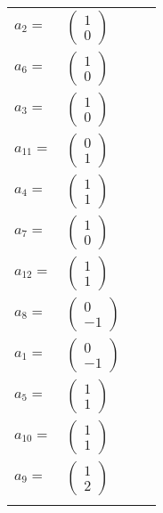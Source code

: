 \documentclass[1p]{elsarticle_modified}
\theoremstyle{definition}
\begin{document}
\begin{tabular}{m{7pt} m{180pt} m{7pt} m{180pt} }
\flushright $a_{2}=$&$\begin{pmatrix}1\\0\end{pmatrix}$ \\
\flushright $a_{6}=$&$\begin{pmatrix}1\\0\end{pmatrix}$ \\
\flushright $a_{3}=$&$\begin{pmatrix}1\\0\end{pmatrix}$ \\
\flushright $a_{11}=$&$\begin{pmatrix}0\\1\end{pmatrix}$ \\
\flushright $a_{4}=$&$\begin{pmatrix}1\\1\end{pmatrix}$ \\
\flushright $a_{7}=$&$\begin{pmatrix}1\\0\end{pmatrix}$ \\
\flushright $a_{12}=$&$\begin{pmatrix}1\\1\end{pmatrix}$ \\
\flushright $a_{8}=$&$\begin{pmatrix}0\\-1\end{pmatrix}$ \\
\flushright $a_{1}=$&$\begin{pmatrix}0\\-1\end{pmatrix}$ \\
\flushright $a_{5}=$&$\begin{pmatrix}1\\1\end{pmatrix}$ \\
\flushright $a_{10}=$&$\begin{pmatrix}1\\1\end{pmatrix}$ \\
\flushright $a_{9}=$&$\begin{pmatrix}1\\2\end{pmatrix}$\\&\end{tabular}
\end{document}
